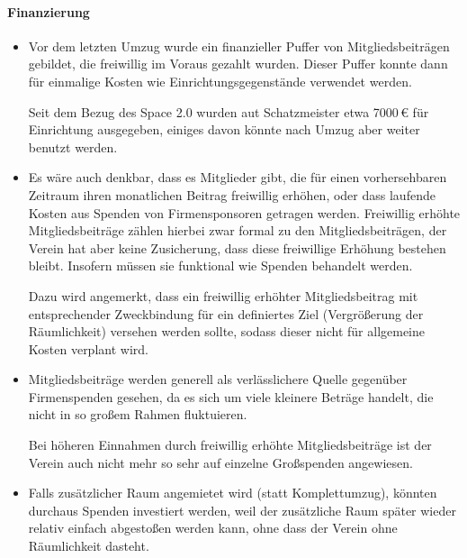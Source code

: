 \documentclass{s0minutes}
\begin{document}
\paragraph{Finanzierung}
\begin{itemize}
  \item Vor dem letzten Umzug wurde ein finanzieller Puffer von
    Mitgliedsbeiträgen gebildet, die freiwillig im Voraus gezahlt wurden. Dieser
    Puffer konnte dann für einmalige Kosten wie Einrichtungsgegenstände
    verwendet werden.

    Seit dem Bezug des Space 2.0 wurden aut Schatzmeister etwa 7000\,€ für
    Einrichtung ausgegeben, einiges davon könnte nach Umzug aber weiter benutzt
    werden.

  \item Es wäre auch denkbar, dass es Mitglieder gibt, die für einen
    vorhersehbaren Zeitraum ihren monatlichen Beitrag freiwillig erhöhen, oder
    dass laufende Kosten aus Spenden von Firmensponsoren getragen werden.
    Freiwillig erhöhte Mitgliedsbeiträge zählen hierbei zwar formal zu den
    Mitgliedsbeiträgen, der Verein hat aber keine Zusicherung, dass diese
    freiwillige Erhöhung bestehen bleibt. Insofern müssen sie funktional wie
    Spenden behandelt werden.

    Dazu wird angemerkt, dass ein freiwillig erhöhter Mitgliedsbeitrag mit
    entsprechender Zweckbindung für ein definiertes Ziel (Vergrößerung der
    Räumlichkeit) versehen werden sollte, sodass dieser nicht für
    allgemeine Kosten verplant wird.

  \item Mitgliedsbeiträge werden generell als verlässlichere Quelle gegenüber
    Firmenspenden gesehen, da es sich um viele kleinere Beträge handelt, die
    nicht in so großem Rahmen fluktuieren.

    Bei höheren Einnahmen durch freiwillig erhöhte Mitgliedsbeiträge ist
    der Verein auch nicht mehr so sehr auf einzelne Großspenden angewiesen.

  \item Falls zusätzlicher Raum angemietet wird (statt Komplettumzug),
    könnten durchaus Spenden investiert werden, weil der zusätzliche Raum
    später wieder relativ einfach abgestoßen werden kann, ohne dass der Verein
    ohne Räumlichkeit dasteht.
\end{itemize}
\end{document}
